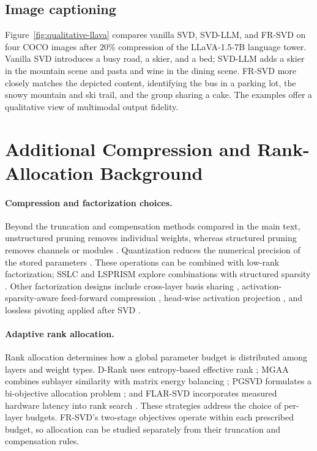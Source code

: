 

\subsection{Image captioning}
Figure~\ref{fig:qualitative-llava} compares vanilla SVD, SVD-LLM, and FR-SVD on four COCO images after $20\%$ compression of the LLaVA-1.5-7B language tower. Vanilla SVD introduces a busy road, a skier, and a bed; SVD-LLM adds a skier in the mountain scene and pasta and wine in the dining scene. FR-SVD more closely matches the depicted content, identifying the bus in a parking lot, the snowy mountain and ski trail, and the group sharing a cake. The examples offer a qualitative view of multimodal output fidelity.



\section{Additional Compression and Rank-Allocation Background}\label{app:related-work}

\paragraph{Compression and factorization choices.}
Beyond the truncation and compensation methods compared in the main text, unstructured pruning removes individual weights, whereas structured pruning removes channels or modules \citep{frantar2023sparsegpt,ma2023llmpruner,ashkboos2024slicegpt}. Quantization reduces the numerical precision of the stored parameters \citep{frantar2023gptq,lin2023awq}. These operations can be combined with low-rank factorization; SSLC and LSPRISM explore combinations with structured sparsity \citep{zong2025sslc,tao2025lsprism}. Other factorization designs include cross-layer basis sharing \citep{wang2024basissharing}, activation-sparsity-aware feed-forward compression \citep{huang2025sola}, head-wise activation projection \citep{tian2025flatllm}, and lossless pivoting applied after SVD \citep{zhao2025pifa}.

\paragraph{Adaptive rank allocation.}
Rank allocation determines how a global parameter budget is distributed among layers and weight types. D-Rank uses entropy-based effective rank \citep{mi2025drank}; MGAA combines sublayer similarity with matrix energy balancing \citep{li2025mgaa}; PGSVD formulates a bi-objective allocation problem \citep{solgi2025pgsvd}; and FLAR-SVD incorporates measured hardware latency into rank search \citep{thoma2025flarsvd}. These strategies address the choice of per-layer budgets. FR-SVD's two-stage objectives operate within each prescribed budget, so allocation can be studied separately from their truncation and compensation rules.
